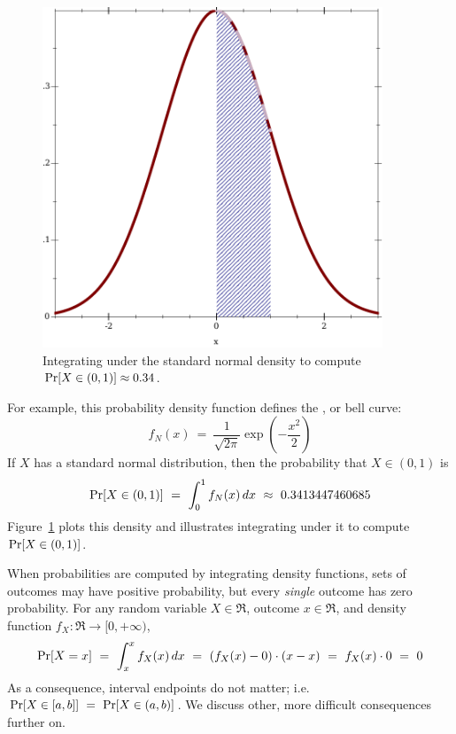 \begin{figure}[tb]\centering
\includegraphics[width=4in]{figures/density-integrate}
\caption[Computing probabilities using the standard normal density function]{Integrating under the standard normal density to compute $\mathrm{Pr}\!\left[{X \in (0,1)}\right] \approx 0.34$.}
\label{fig:density-integrate}
\end{figure}

For example, this probability density function defines the , or bell curve:
\begin{equation}
	f_N(x)\ =\ \frac{1}{\sqrt{2\pi}} \exp\left(-\frac{x^2}{2}\right)
\end{equation}
If $X$ has a standard normal distribution, then the probability that $X \in (0,1)$ is
\begin{equation}
	\mathrm{Pr}\!\left[{X \in (0,1)}\right]\ =\ \int_0^1 f_N(x)\,dx\ \approx\ 0.3413447460685
\end{equation}
Figure~\ref{fig:density-integrate} plots this density and illustrates integrating under it to compute $\mathrm{Pr}\!\left[{X \in (0,1)}\right]$.

When probabilities are computed by integrating density functions, sets of outcomes may have positive probability, but every \emph{single} outcome has zero probability.
For any random variable $X \in \Re$, outcome $x \in \Re$, and density function $f_X : \Re \to [0,+\infty)$,
\begin{equation}
	\Pspec{X = x}\ =\ \int_x^x f_X(x)\, dx\ =\ (f_X(x) - 0) \cdot (x - x)\ =\ f_X(x) \cdot 0\ =\ 0
\end{equation}
As a consequence, interval endpoints do not matter; i.e. $\mathrm{Pr}\!\left[{X \in [a,b]}\right]\ =\ \mathrm{Pr}\!\left[{X \in (a,b)}\right]$.
We discuss other, more difficult consequences further on.

